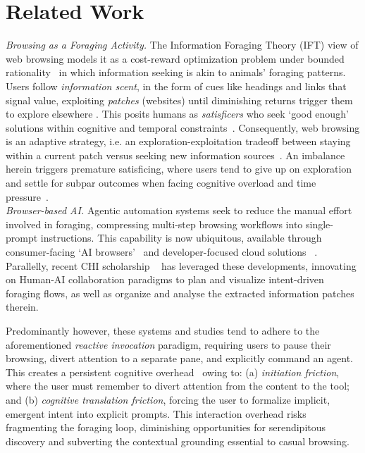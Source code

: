 \documentclass[sigconf]{acmart}
\begin{document}
\section{Related Work}
\textit{Browsing as a Foraging Activity.} 
\label{sec: foraging}The Information Foraging Theory (IFT) view of web browsing models it as a cost-reward optimization problem under bounded rationality~\cite{IFT} in which information seeking is akin to animals' foraging patterns. Users follow \emph{information scent}, in the form of cues like headings and links that signal value, exploiting \emph{patches} (websites) until diminishing returns trigger them to explore elsewhere \cite{explo3}. This posits humans as \emph{satisficers} who seek `good enough' solutions within cognitive and temporal constraints~\cite{Simon}. Consequently, web browsing is an adaptive strategy, i.e. an exploration-exploitation tradeoff between staying within a current patch versus seeking new information sources~\cite{Explo, explo2}. An imbalance herein triggers premature satisficing, where users tend to give up on exploration and settle for subpar outcomes when facing cognitive overload and time pressure~\cite{AgostoYoung, satisficing}. \\


\textit{Browser-based AI.} 
\label{sec: aibrowsers}
Agentic automation systems seek to reduce the manual effort involved in foraging, compressing multi-step browsing workflows into single-prompt instructions. This capability is now ubiquitous, available through consumer-facing `AI browsers'~\cite{Edge, Comet, dia} and developer-focused cloud solutions ~\cite{browserbase, browseruse2025}. Parallelly, recent CHI scholarship ~\cite{prism, orca} has leveraged these developments, innovating on Human-AI collaboration paradigms to plan and visualize intent-driven foraging flows, as well as organize and analyse the extracted information patches therein. 

Predominantly however, these systems and studies tend to adhere to the aforementioned \textit{reactive invocation} paradigm, requiring users to pause their browsing, divert attention to a separate pane, and explicitly command an agent. This creates a persistent cognitive overhead~\cite{ucs, gulf} owing to: (a) \textit{initiation friction}, where the user must remember to divert attention from the content to the tool; and (b) \textit{cognitive translation friction}, forcing the user to formalize implicit, emergent intent into explicit prompts. This interaction overhead risks fragmenting the foraging loop, diminishing opportunities for serendipitous discovery and subverting the contextual grounding essential to casual browsing.\\
\end{document}
